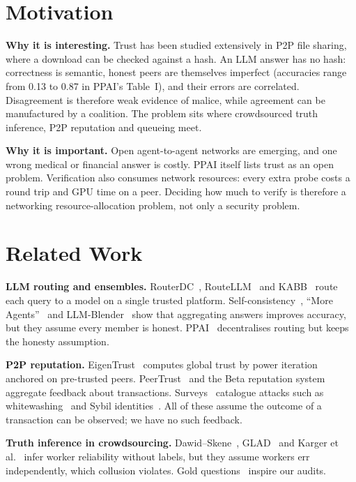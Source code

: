 \documentclass[conference]{IEEEtran}
\begin{document}
\section{Motivation}
\textbf{Why it is interesting.} Trust has been studied extensively in P2P file sharing, where a
download can be checked against a hash. An LLM answer has no hash: correctness is semantic, honest
peers are themselves imperfect (accuracies range from 0.13 to 0.87 in PPAI's Table~I), and their
errors are correlated. Disagreement is therefore weak evidence of malice, while agreement can be
manufactured by a coalition. The problem sits where crowdsourced truth inference, P2P reputation
and queueing meet.

\textbf{Why it is important.} Open agent-to-agent networks are emerging, and one wrong medical or
financial answer is costly. PPAI itself lists trust as an open problem. Verification also consumes
network resources: every extra probe costs a round trip and GPU time on a peer. Deciding how much to
verify is therefore a networking resource-allocation problem, not only a security problem.

\section{Related Work}
\textbf{LLM routing and ensembles.} RouterDC~\cite{routerdc}, RouteLLM~\cite{routellm} and
KABB~\cite{kabb} route each query to a model on a single trusted platform. Self-consistency~\cite{selfconsistency},
``More Agents''~\cite{moreagents} and LLM-Blender~\cite{llmblender} show that aggregating answers
improves accuracy, but they assume every member is honest. PPAI~\cite{ppai} decentralises routing
but keeps the honesty assumption.

\textbf{P2P reputation.} EigenTrust~\cite{eigentrust} computes global trust by power iteration
anchored on pre-trusted peers. PeerTrust~\cite{peertrust} and the Beta reputation
system~\cite{betarep} aggregate feedback about transactions. Surveys~\cite{marti2006,hoffman2009}
catalogue attacks such as whitewashing~\cite{whitewash} and Sybil identities~\cite{sybil}. All of
these assume the outcome of a transaction can be observed; we have no such feedback.

\textbf{Truth inference in crowdsourcing.} Dawid--Skene~\cite{dawidskene}, GLAD~\cite{glad} and
Karger et al.~\cite{karger2011} infer worker reliability without labels, but they assume workers err
independently, which collusion violates. Gold questions~\cite{gold} inspire our audits.
\end{document}
